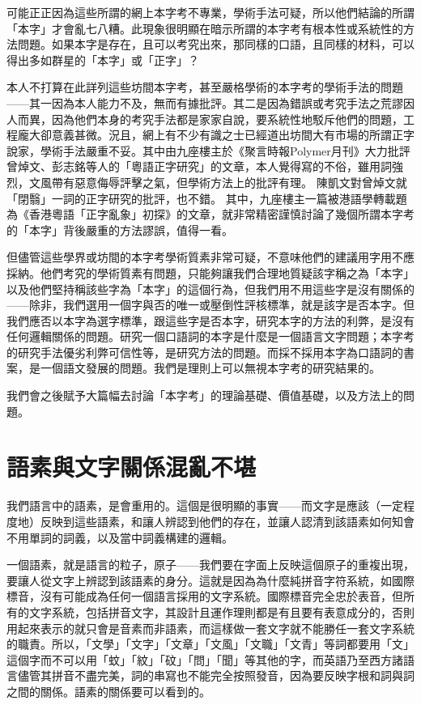 \documentclass[a5paper, 12pt, openany]{book} %
\begin{document}
可能正正因為這些所謂的網上本字考不專業，學術手法可疑，所以他們結論的所謂「本字」才會亂七八糟。此現象很明顯在暗示所謂的本字考有根本性或系統性的方法問題。如果本字是存在，且可以考究出來，那同樣的口語，且同樣的材料，可以得出多如群星的「本字」或「正字」？

本人不打算在此詳列這些坊間本字考，甚至嚴格學術的本字考的學術手法的問題——其一因為本人能力不及，無而有據批評。其二是因為錯誤或考究手法之荒謬因人而異，因為他們本身的考究手法都是家家自說，要系統性地駁斥他們的問題，工程龐大卻意義甚微。況且，網上有不少有識之士已經道出坊間大有市場的所謂正字說家，學術手法嚴重不妥。其中由九座樓主於《聚言時報Polymer月刊》大力批評曾焯文、彭志銘等人的「粵語正字研究」的文章，本人覺得寫的不俗，雖用詞強烈，文風帶有惡意侮辱評擊之氣，但學術方法上的批評有理。 陳凱文對曾焯文就「閉翳」一詞的正字研究的批評，也不錯。  其中，九座樓主一篇被港語學轉載題為《香港粵語「正字亂象」初探》的文章，就非常精密謹慎討論了幾個所謂本字考的「本字」背後嚴重的方法謬誤，值得一看。 

但儘管這些學界或坊間的本字考學術質素非常可疑，不意味他們的建議用字用不應採納。他們考究的學術質素有問題，只能夠讓我們合理地質疑該字稱之為「本字」以及他們堅持稱該些字為「本字」的這個行為，但我們用不用這些字是沒有關係的——除非，我們選用一個字與否的唯一或壓倒性評核標準，就是該字是否本字。但我們應否以本字為選字標準，跟這些字是否本字，研究本字的方法的利弊，是沒有任何邏輯關係的問題。研究一個口語詞的本字是什麼是一個語言文字問題；本字考的研究手法優劣利弊可信性等，是研究方法的問題。而採不採用本字為口語詞的書案，是一個語文發展的問題。我們是理則上可以無視本字考的研究結果的。

我們會之後賦予大篇幅去討論「本字考」的理論基礎、價值基礎，以及方法上的問題。

\section{語素與文字關係混亂不堪}

我們語言中的語素，是會重用的。這個是很明顯的事實——而文字是應該（一定程度地）反映到這些語素，和讓人辨認到他們的存在，並讓人認清到該語素如何知會不用單詞的詞義，以及當中詞義構建的邏輯。

一個語素，就是語言的粒子，原子——我們要在字面上反映這個原子的重複出現，要讓人從文字上辨認到該語素的身分。這就是因為為什麼純拼音字符系統，如國際標音，沒有可能成為任何一個語言採用的文字系統。國際標音完全忠於表音，但所有的文字系統，包括拼音文字，其設計且運作理則都是有且要有表意成分的，否則用起來表示的就只會是音素而非語素，而這樣做一套文字就不能勝任一套文字系統的職責。所以，「文學」「文字」「文章」「文風」「文職」「文青」等詞都要用「文」這個字而不可以用「蚊」「紋」「砇」「問」「聞」等其他的字，而英語乃至西方諸語言儘管其拼音不盡完美，詞的串寫也不能完全按照發音，因為要反映字根和詞與詞之間的關係。語素的關係要可以看到的。
\end{document}
